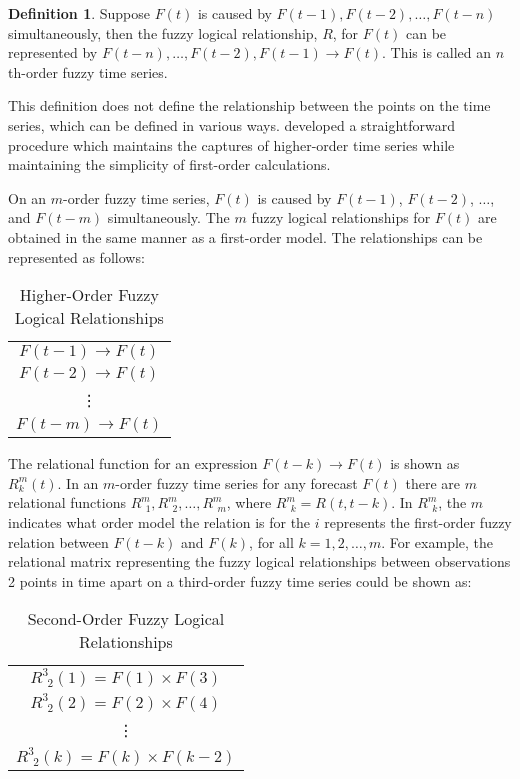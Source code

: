 \documentclass{article}
\theoremstyle{definition}
\newtheorem{ftsdef}{Definition}
\begin{document}
\begin{ftsdef}
Suppose $F(t)$ is caused by $F(t-1),F(t-2),\ldots,F(t-n)$ simultaneously, then the fuzzy logical relationship, $R$, for $F(t)$ can be represented by $F(t-n),\ldots, F(t-2),F(t-1) \rightarrow F(t)$. This is called an $n$th-order fuzzy time series.
\end{ftsdef}

This definition does not define the relationship between the points on the time series, which can be defined in various ways. \cite{tsai1999study} developed a straightforward procedure which maintains the captures of higher-order time series while maintaining the simplicity of first-order calculations.

On an $m$-order fuzzy time series, $F(t)$ is caused by $F(t-1)$, $F(t-2)$, $\ldots$, and $F(t-m)$ simultaneously. The $m$ fuzzy logical relationships for $F(t)$ are obtained in the same manner as a first-order model. The relationships can be represented as follows:

\begin{table}[H]
	\center
	\begin{tabular}{ c }
  	$F(t-1) \rightarrow F(t)$ \\
  	$F(t-2) \rightarrow F(t)$ \\
  	\vdots \\
  	$F(t-m) \rightarrow F(t)$ \\
	\end{tabular}
	\caption{Higher-Order Fuzzy Logical Relationships}
\end{table}

The relational function for an expression $F(t-k) \rightarrow F(t)$ is shown as $R^{m}_{k}(t)$. In an $m$-order fuzzy time series for any forecast $F(t)$ there are $m$ relational functions $R^{m}_{\ \ 1}, R^{m}_{\ \ 2}, \ldots, R^{m}_{\ \ m}$, where $R^{m}_{\ \ k}=R(t,t-k)$. In $R^{m}_{\ \ k}$, the $m$ indicates what order model the relation is for the $i$ represents the first-order fuzzy relation between $F(t-k)$ and $F(k)$, for all $k={1,2,\ldots,m}$. For example, the relational matrix representing the fuzzy logical relationships between observations 2 points in time apart on a third-order fuzzy time series could be shown as:

\begin{table}[H]
	\center
	\begin{tabular}{ c }
  	$R^{3}_{\ \ 2}(1) = F(1) \times F(3)$ \\
  	$R^{3}_{\ \ 2}(2) = F(2) \times F(4)$ \\
  	\vdots \\
  	$R^{3}_{\ \ 2}(k) = F(k) \times F(k-2)$ \\
	\end{tabular}
	\caption{Second-Order Fuzzy Logical Relationships}
\end{table}
\end{document}
